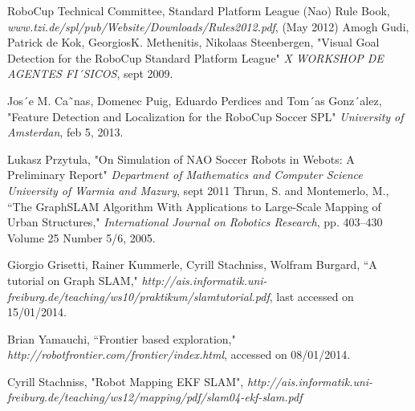 \documentclass{ba-kecs}
\numberwithin{figure}{section}
\numberwithin{equation}{section}
\begin{document}
\begin{thebibliography}{99}

 RoboCup Technical Committee, Standard Platform League (Nao) Rule Book, \emph{www.tzi.de/spl/pub/Website/Downloads/Rules2012.pdf}, (May 2012)
 Amogh Gudi, Patrick de Kok, GeorgiosK. Methenitis, Nikolaas Steenbergen, "Visual Goal Detection for the RoboCup Standard Platform League" \emph{X WORKSHOP DE AGENTES FI´SICOS}, sept 2009.

 Jos´e M. Ca˜nas, Domenec Puig, Eduardo Perdices and Tom´as Gonz´alez, "Feature Detection and Localization for the
RoboCup Soccer SPL" \emph{University of Amsterdan}, feb 5, 2013.

 Lukasz Przytula, "On Simulation of NAO Soccer Robots in Webots: A Preliminary Report" \emph{Department of Mathematics and Computer Science University of Warmia and Mazury}, sept 2011
 Thrun, S. and Montemerlo, M., ``The GraphSLAM Algorithm With Applications to Large-Scale Mapping of Urban Structures," \emph{International Journal on Robotics Research}, pp. 403--430 Volume 25 Number 5/6, 2005.

 Giorgio Grisetti, Rainer Kummerle, Cyrill Stachniss, Wolfram Burgard, ``A tutorial on Graph SLAM," \emph{http://ais.informatik.uni-freiburg.de/teaching/ws10/praktikum/slamtutorial.pdf}, last accessed on 15/01/2014.
 
 Brian Yamauchi, ``Frontier based exploration," \emph{http://robotfrontier.com/frontier/index.html}, accessed on 08/01/2014. 

 Cyrill Stachniss, "Robot Mapping EKF SLAM", \emph{http://ais.informatik.uni-freiburg.de/teaching/ws12/mapping/pdf/slam04-ekf-slam.pdf }


\end{thebibliography}
\end{document}
